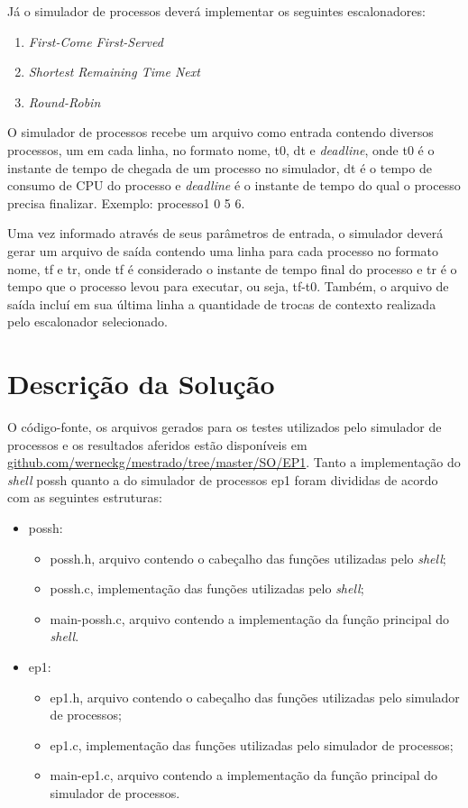 \documentclass[12pt]{article}
\begin{document}
Já o simulador de processos deverá implementar os seguintes escalonadores:
\begin{enumerate}
	\item \textit{First-Come First-Served}
	\item \textit{Shortest Remaining Time Next}
	\item \textit{Round-Robin}
\end{enumerate}

O simulador de processos recebe um arquivo como entrada contendo diversos processos, um em cada linha, no formato nome, t0, dt e \textit{deadline}, onde t0 é o instante de tempo de chegada de um processo no simulador, dt é o tempo de consumo de CPU do processo e \textit{deadline} é o instante de tempo do qual o processo precisa finalizar. Exemplo: processo1 0 5 6.

Uma vez informado através de seus parâmetros de entrada, o simulador deverá gerar um arquivo de saída contendo uma linha para cada processo no formato nome, tf e tr, onde tf é considerado o instante de tempo final do processo e tr é o tempo que o processo levou para executar, ou seja, tf-t0. Também, o arquivo de saída incluí em sua última linha a quantidade de trocas de contexto realizada pelo escalonador selecionado.

\section{Descrição da Solução}

O código-fonte, os arquivos gerados para os testes utilizados pelo simulador de processos e os resultados aferidos estão disponíveis em \url{github.com/werneckg/mestrado/tree/master/SO/EP1}. Tanto a implementação do \textit{shell} possh quanto a do simulador de processos ep1 foram divididas de acordo com as seguintes estruturas:
\begin{itemize}
	\item possh:
	\begin{itemize}
		\item possh.h, arquivo contendo o cabeçalho das funções utilizadas pelo \textit{shell};
		\item possh.c, implementação das funções utilizadas pelo \textit{shell};
		\item main-possh.c, arquivo contendo a implementação da função principal do \textit{shell}.
	\end{itemize}
	\item ep1:
	\begin{itemize}
		\item ep1.h, arquivo contendo o cabeçalho das funções utilizadas pelo simulador de processos;
		\item ep1.c, implementação das funções utilizadas pelo simulador de processos;
		\item main-ep1.c, arquivo contendo a implementação da função principal do simulador de processos.
	\end{itemize}

\end{itemize}
\end{document}
